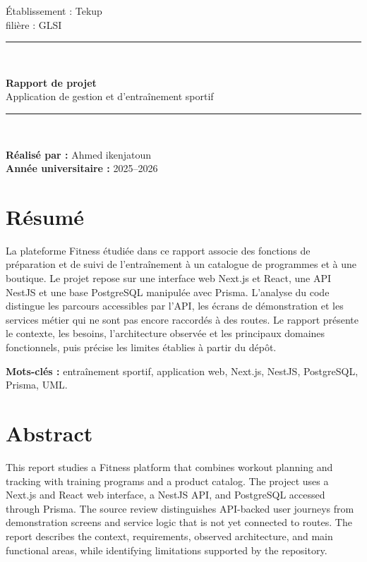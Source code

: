 ﻿\documentclass[12pt,a4paper]{report}
\begin{document}
\hypersetup{pageanchor=false}
\begin{titlepage}
  \centering
  \vspace*{2cm}
  {\Large Établissement : Tekup\\[0.4cm]}
  {\large filière : GLSI\\[2cm]}
  {\rule{\textwidth}{0.5pt}\\[0.6cm]}
  {\Huge\bfseries Rapport de projet\\[0.5cm]}
  {\LARGE Application de gestion et d’entraînement sportif\\[0.6cm]}
  {\rule{\textwidth}{0.5pt}\\[2cm]}
  \vfill
  \begin{flushleft}
    \textbf{Réalisé par :} Ahmed ikenjatoun\\
    \textbf{Année universitaire :} 2025--2026
  \end{flushleft}
\end{titlepage}

\hypersetup{pageanchor=true}
\chapter*{Résumé}
La plateforme Fitness étudiée dans ce rapport associe des fonctions de préparation et de suivi de l'entraînement à un catalogue de programmes et à une boutique. Le projet repose sur une interface web Next.js et React, une API NestJS et une base PostgreSQL manipulée avec Prisma. L'analyse du code distingue les parcours accessibles par l'API, les écrans de démonstration et les services métier qui ne sont pas encore raccordés à des routes. Le rapport présente le contexte, les besoins, l'architecture observée et les principaux domaines fonctionnels, puis précise les limites établies à partir du dépôt.

\noindent\textbf{Mots-clés :} entraînement sportif, application web, Next.js, NestJS, PostgreSQL, Prisma, UML.
\clearpage
\chapter*{Abstract}
This report studies a Fitness platform that combines workout planning and tracking with training programs and a product catalog. The project uses a Next.js and React web interface, a NestJS API, and PostgreSQL accessed through Prisma. The source review distinguishes API-backed user journeys from demonstration screens and service logic that is not yet connected to routes. The report describes the context, requirements, observed architecture, and main functional areas, while identifying limitations supported by the repository.
\end{document}
